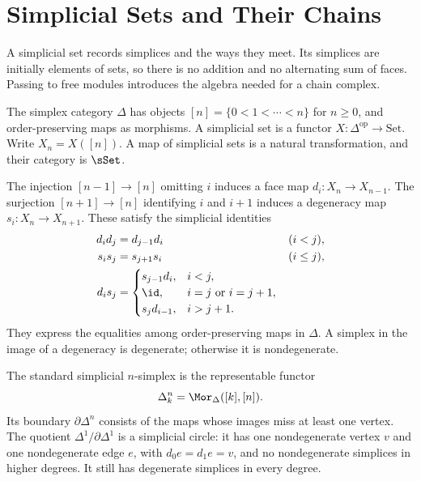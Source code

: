 \documentclass[11pt]{article}
\begin{document}
\section{Simplicial Sets and Their Chains}\label{sec:simplicial}
A simplicial set records simplices and the ways they meet. Its simplices are initially elements of sets, so there is no addition and no alternating sum of faces. Passing to free modules introduces the algebra needed for a chain complex.

\begin{definition}\label{def:sset}
The simplex category $\Delta$ has objects $[n]=\{0<1<\cdots<n\}$ for $n\geq0$, and order-preserving maps as morphisms. A simplicial set is a functor $X:\Delta^{\mathrm{op}}\to\mathrm{Set}$. Write $X_n=X([n])$. A map of simplicial sets is a natural transformation, and their category is $\sSet$.
\end{definition}
The injection $[n-1]\to[n]$ omitting $i$ induces a face map $d_i:X_n\to X_{n-1}$. The surjection $[n+1]\to[n]$ identifying $i$ and $i+1$ induces a degeneracy map $s_i:X_n\to X_{n+1}$. These satisfy the simplicial identities
\[
\begin{aligned}
d_i d_j&=d_{j-1}d_i &&(i<j),\\
s_i s_j&=s_{j+1}s_i &&(i\leq j),\\
d_i s_j&=
\begin{cases}
s_{j-1}d_i,&i<j,\\
\id,&i=j\text{ or }i=j+1,\\
s_jd_{i-1},&i>j+1.
\end{cases}
\end{aligned}
\]
They express the equalities among order-preserving maps in $\Delta$. A simplex in the image of a degeneracy is degenerate; otherwise it is nondegenerate.

\begin{example}\label{ex:circle}
The standard simplicial $n$-simplex is the representable functor
\[
\Delta^n_k=\Mor_{\Delta}([k],[n]).
\]
Its boundary $\partial\Delta^n$ consists of the maps whose images miss at least one vertex. The quotient $\Delta^1/\partial\Delta^1$ is a simplicial circle: it has one nondegenerate vertex $v$ and one nondegenerate edge $e$, with $d_0e=d_1e=v$, and no nondegenerate simplices in higher degrees. It still has degenerate simplices in every degree.
\end{example}
\end{document}
